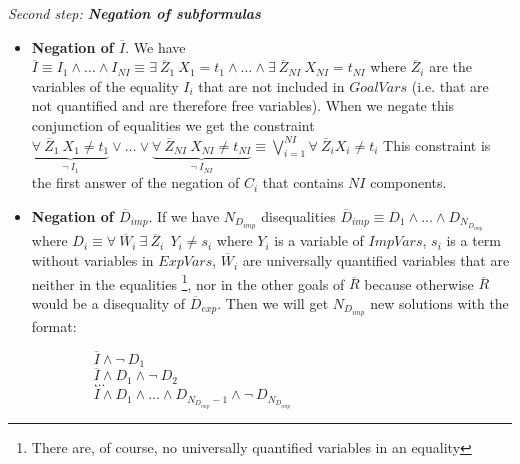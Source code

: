 \documentclass{tlp}
\begin{document}
\noindent
{\em Second step: {\bf Negation of subformulas}}

        \begin{itemize}

           \item {\bf Negation of $\overline{I}$}. We have $\overline{I}
           \equiv I_1 \wedge \ldots \wedge I_{NI} \equiv \exists~
           \overline{Z}_1~ X_1 = t_1 \wedge \ldots \wedge \exists~
           \overline{Z}_{NI}~ X_{NI} = t_{NI} $ where
           $\overline{Z}_i$ are the variables of the equality $I_i$ that
           are not included in $GoalVars$ (i.e. that are not quantified
           and are therefore free variables). When we negate this
           conjunction of equalities we get the constraint 
                $
           \underbrace{\forall~ \overline{Z}_1~ X_1 \neq t_1} _{\neg~
           I_1} \vee \ldots \vee \underbrace{\forall~
           \overline{Z}_{NI}~ X_{NI} \neq t_{NI} } _{\neg~ I_{NI}}
           \equiv %
           \bigvee_{i=1}^{NI} \forall~ \overline{Z}_i X_i
           \neq t_i $ 
           This constraint is the first answer of the
           negation of $C_i$ that contains $NI$ components.

           \item {\bf Negation of $\overline{D}_{imp}$}. If we have
           $N_{D_{imp}}$ disequalities $\overline{D}_{imp} \equiv D_1
           \wedge \ldots \wedge D_{N_{D_{imp}}}$ where $ D_i \equiv
           \forall~ \overline{W}_i ~ \exists~ \overline{Z}_i ~~  Y_i
           \neq s_i$ where $Y_i$ is a variable of $ImpVars$, $s_i$ is
           a term without variables in $ExpVars$, $\overline{W}_i$ are
           universally quantified variables that are neither in the
           equalities \footnote{There are, of course, no universally
           quantified variables in an equality}, nor in the other
           goals of $\overline{R}$ because otherwise $\overline{R}$
           would be a disequality of $\overline{D}_{exp}$. Then we
           will get $N_{D_{imp}}$ new solutions with the format: 

           $~~~~~~~~~~~~~~~~~~~~\overline{I} \wedge \neg~ D_1 $ \\ 
           $~~~~~~~~~~~~~~~~~~~~\overline{I} \wedge
           D_1 \wedge \neg~ D_2 $ \\ 
           $~~~~~~~~~~~~~~~~~~~~\ldots $ \\ 
           $~~~~~~~~~~~~~~~~~~~~\overline{I} \wedge
           D_1 \wedge \ldots \wedge D_{N_{D_{imp}}-1} \wedge \neg~
           D_{N_{D_{imp}}}$ 


\end{itemize}
\end{document}
